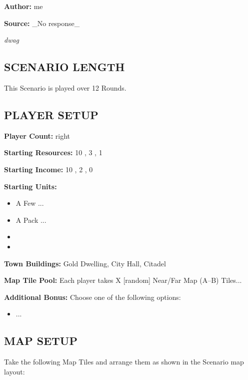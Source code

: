 
\begin{multicols*}{2}

\textbf{Author:} me

\textbf{Source:} _No response_

\textit{dwag}

\subsection*{\MakeUppercase{Scenario Length}}

This Scenario is played over 12 Rounds.

\subsection*{\MakeUppercase{Player Setup}}

\textbf{Player Count:} right

\textbf{Starting Resources:} 10 , 3 , 1 

\textbf{Starting Income:} 10 , 2 , 0 

\textbf{Starting Units:}
\begin{itemize}
  \item A Few ...
  \item A Pack ...
  \item {}
  \item {}
\end{itemize}

\textbf{Town Buildings:} Gold Dwelling, City Hall, Citadel

\textbf{Map Tile Pool:} Each player takes X [random] Near/Far Map (A--B) Tiles...

\textbf{Additional Bonus:} Choose one of the following options:

\begin{itemize}
    \item ...
\end{itemize}

\subsection*{\MakeUppercase{Map Setup}}

Take the following Map Tiles and arrange them as shown in the Scenario map layout:


\end{multicols*}
